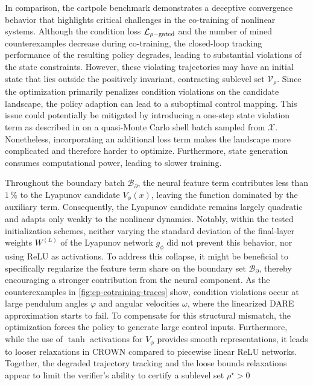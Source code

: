 In comparison, the cartpole benchmark demonstrates a deceptive convergence behavior 
that highlights critical challenges in the co-training of nonlinear systems. 
Although the condition loss $\mathcal{L}_{\rho\mathrm{-gated}}$ and the number of mined counterexamples decrease 
during co-training, the closed-loop tracking performance of the resulting policy degrades, 
leading to substantial violations of the state constraints. However, these violating trajectories may have an initial state 
that lies outside the positively invariant, contracting sublevel set $\mathcal{V}_\rho$. 
Since the optimization primarily penalizes condition violations on the candidate landscape, 
the policy adaption can lead to a suboptimal control mapping.
This issue could potentially be mitigated by introducing a one-step state violation term as described in  
on a quasi-Monte Carlo shell batch sampled from $\mathcal{X}$. Nonetheless, incorporating an additional loss term makes the 
landscape more complicated and therefore harder to optimize. Furthermore, state generation consumes computational 
power, leading to slower training. 

Throughout the boundary batch $\mathcal{B}_\partial$, the neural feature term contributes less than $1\,\%$ to the 
Lyapunov candidate $V_\phi(x)$, leaving the function dominated by the auxiliary term. 
Consequently, the Lyapunov candidate remains largely quadratic and adapts only weakly to the nonlinear dynamics. 
Notably, within the tested initialization schemes, neither varying the standard deviation of the final-layer weights $W^{(L)}$ 
of the Lyapunov network $g_\phi$ did not prevent this behavior, nor using ReLU as activations.
To address this collapse, it might be beneficial to specifically regularize the feature term share on the boundary set $\mathcal{B}_\partial$, 
thereby encouraging a stronger contribution from the neural component.
As the counterexamples in \cref{fig:cp-cotraining-traces} show, condition violations 
occur at large pendulum angles $\varphi$ and angular velocities $\omega$, 
where the linearized DARE approximation starts to fail.
To compensate for this structural mismatch, the optimization forces the policy to generate large control inputs. 
Furthermore, while the use of $\tanh$ activations for $V_\phi$ provides smooth representations, 
it leads to looser relaxations in CROWN compared to piecewise linear ReLU networks. 
Together, the degraded trajectory tracking and the loose bounds relaxations appear to limit the 
verifier's ability to certify a sublevel set $\rho^\star > 0$
